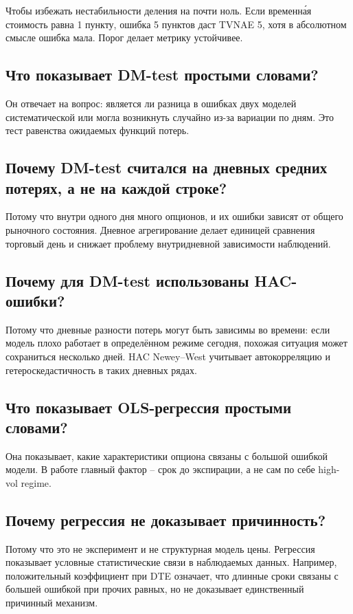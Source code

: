 \documentclass[11pt,a4paper]{article}
\begin{document}
Чтобы избежать нестабильности деления на почти ноль. Если временна́я стоимость равна 1 пункту, ошибка 5 пунктов даст TVNAE 5, хотя в абсолютном смысле ошибка мала. Порог делает метрику устойчивее.

\subsection*{Что показывает DM-test простыми словами?}

Он отвечает на вопрос: является ли разница в ошибках двух моделей систематической или могла возникнуть случайно из-за вариации по дням. Это тест равенства ожидаемых функций потерь.

\subsection*{Почему DM-test считался на дневных средних потерях, а не на каждой строке?}

Потому что внутри одного дня много опционов, и их ошибки зависят от общего рыночного состояния. Дневное агрегирование делает единицей сравнения торговый день и снижает проблему внутридневной зависимости наблюдений.

\subsection*{Почему для DM-test использованы HAC-ошибки?}

Потому что дневные разности потерь могут быть зависимы во времени: если модель плохо работает в определённом режиме сегодня, похожая ситуация может сохраниться несколько дней. HAC Newey--West учитывает автокорреляцию и гетероскедастичность в таких дневных рядах.

\subsection*{Что показывает OLS-регрессия простыми словами?}

Она показывает, какие характеристики опциона связаны с большой ошибкой модели. В работе главный фактор -- срок до экспирации, а не сам по себе high-vol regime.

\subsection*{Почему регрессия не доказывает причинность?}

Потому что это не эксперимент и не структурная модель цены. Регрессия показывает условные статистические связи в наблюдаемых данных. Например, положительный коэффициент при DTE означает, что длинные сроки связаны с большей ошибкой при прочих равных, но не доказывает единственный причинный механизм.
\end{document}
